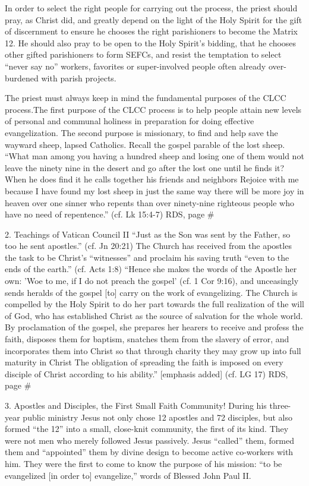 \documentclass[oneside]{book}
\begin{document}
In order to select the right people for carrying out the process, the priest
should pray, as Christ did, and greatly depend on the light of the Holy Spirit
for the gift of discernment to ensure he chooses the right parishioners to
become the Matrix 12. He should also pray to be open to the Holy Spirit's
bidding, that he chooses other gifted parishioners to form SEFCs, and resist the
temptation to select ``never say no'' workers, favorites or super-involved
people often already over-burdened with parish projects.

The priest must always keep in mind the fundamental purposes of the CLCC
process.The first purpose of the CLCC process is to help people attain new
levels of personal and communal holiness in preparation for doing effective
evangelization. The second purpose is missionary, to find and help save the
wayward sheep, lapsed Catholics. Recall the gospel parable of the lost
sheep. ``What man among you having a hundred sheep and losing one of them would
not leave the ninety nine in the desert and go after the lost one until he finds
it? When he does find it  he calls together his friends and neighbors  Rejoice
with me because I have found my lost sheep  in just the same way there will be
more joy in heaven over one sinner who repents than over ninety-nine righteous
people who have no need of repentence.'' (cf. Lk 15:4-7)
RDS, page \#

2. Teachings of Vatican Council II
``Just as the Son was sent by the Father, so too he sent apostles.'' (cf. Jn
20:21) The Church has received from the apostles the task to be Christ's
``witnesses'' and proclaim his saving truth ``even to the ends of the earth.''
(cf. Acts 1:8) ``Hence she makes the words of the Apostle her own: 'Woe to me,
if I do not preach the gospel' (cf. 1 Cor 9:16), and unceasingly sends heralds
of the gospel [to]  carry on the work of evangelizing. The Church is compelled
by the Holy Spirit to do her part towards the full realization of the will of
God, who has established Christ as the source of salvation for the whole
world. By proclamation of the gospel, she prepares her hearers to receive and
profess the faith, disposes them for baptism, snatches them from the slavery of
error, and incorporates them into Christ so that through charity they may grow
up into full maturity in Christ  The obligation of spreading the faith is
imposed on every disciple of Christ according to his ability.'' [emphasis added]
(cf. LG 17)
RDS, page \#

3. Apostles and Disciples, the First Small Faith Community!
During his three-year public ministry Jesus not only chose 12 apostles and 72
disciples, but also formed ``the 12'' into a small, close-knit community, the
first of its kind. They were not men who merely followed Jesus passively. Jesus
``called'' them, formed them and ``appointed'' them by divine design to become
active co-workers with him. They were the first to come to know the purpose of
his mission: ``to be evangelized [in order to] evangelize,'' words of Blessed
John Paul II.
\end{document}
